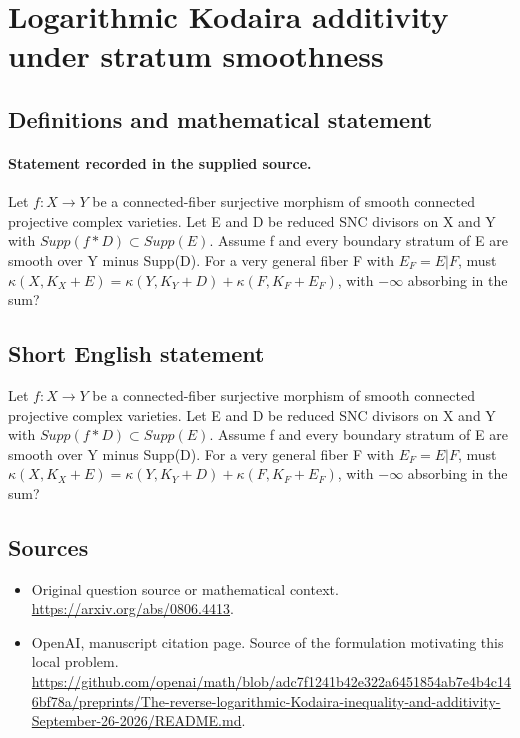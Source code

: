 \documentclass[11pt]{article}
\begin{document}
\section*{Logarithmic Kodaira additivity under stratum smoothness}\label{statement}
\subsection{Definitions and mathematical statement}
\paragraph{Statement recorded in the supplied source.}
Let $f:X\to Y$ be a connected-fiber surjective morphism of smooth connected projective complex varieties. Let E and D be reduced SNC divisors on X and Y with $Supp(f*D)\subset Supp(E)$. Assume f and every boundary stratum of E are smooth over Y minus Supp(D). For a very general fiber F with $E_F=E|F$, must $\kappa (X,K_X+E)=\kappa (Y,K_Y+D)+\kappa (F,K_F+E_F)$, with $-\infty $ absorbing in the sum?
\subsection{Short English statement}
Let $f:X\to Y$ be a connected-fiber surjective morphism of smooth connected projective complex varieties. Let E and D be reduced SNC divisors on X and Y with $Supp(f*D)\subset Supp(E)$. Assume f and every boundary stratum of E are smooth over Y minus Supp(D). For a very general fiber F with $E_F=E|F$, must $\kappa (X,K_X+E)=\kappa (Y,K_Y+D)+\kappa (F,K_F+E_F)$, with $-\infty $ absorbing in the sum?
\subsection{Sources}
\begin{itemize}
\item[S1] Original question source or mathematical context.
\url{https://arxiv.org/abs/0806.4413}.
\item[S2] OpenAI, manuscript citation page. Source of the formulation motivating this local problem.
\url{https://github.com/openai/math/blob/adc7f1241b42e322a6451854ab7e4b4c146bf78a/preprints/The-reverse-logarithmic-Kodaira-inequality-and-additivity-September-26-2026/README.md}.
\end{itemize}
\end{document}
